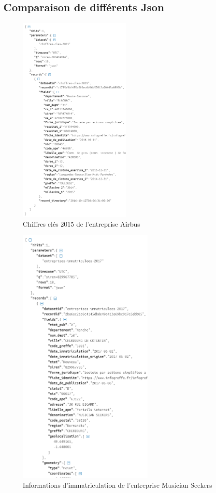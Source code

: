 \documentclass[french]{article}
\begin{document}
{\begin{appendices}
\subsection{Comparaison de différents Json}
\label{appendix:infogreffe_json_compare}

\begin{figure}[ht]
\centering
\includegraphics[width=\textwidth, height=400px, draft=false]{annexes/json1.PNG}
\caption{Chiffres clés 2015 de l'entreprise Airbus}
\label{fig3}
\end{figure}

\begin{figure}[ht]
\centering
\includegraphics[width=\textwidth, height=500px, draft=false]{annexes/json2.PNG}
\caption{Informations d'immatriculation de l'entreprise Musician Seekers}
\label{fig4}
\end{figure}

\end{appendices}

}
\end{document}
